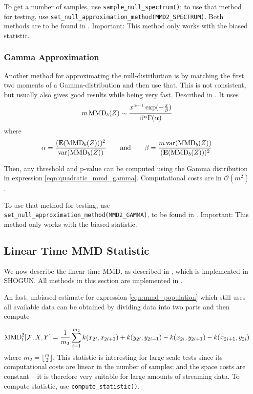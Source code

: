 To get a number of samples, use \texttt{sample\_null\_spectrum()}; to use that method for testing, use \texttt{set\_null\_approximation\_method(MMD2\_SPECTRUM)}. Both methods are to be found in . Important: This method only works with the biased statistic.
\subsubsection{Gamma Approximation}
Another method for approximating the null-distribution is by matching the first two moments of a Gamma-distribution and then use that. This is not consistent, but usually also gives good results while being very fast. Described in \citep{Gretton2012b}. It uses
\begin{align}
\label{eqn:quadratic_mmd_gamma}
m\operatorname{MMD}_b(Z) \sim \frac{x^{\alpha-1}\exp(-\frac{x}{\beta})}{\beta^\alpha \Gamma(\alpha)}
\end{align}
where
\begin{align*}
\alpha=\frac{(\textbf{E}(\text{MMD}_b(Z)))^2}{\operatorname{var}(\text{MMD}_b(Z))} \qquad \text{and} \qquad
 \beta=\frac{m \operatorname{var}(\text{MMD}_b(Z))}{(\textbf{E}(\text{MMD}_b(Z)))^2}
\end{align*}

Then, any threshold and p-value can be computed using the Gamma distribution in expression \ref{eqn:quadratic_mmd_gamma}. Computational costs are in $\mathcal{O}(m^2)$.

To use that method for testing, use \texttt{set\_null\_approximation\_method(MMD2\_GAMMA)}, to be found in . Important: This method only works with the biased statistic.


\subsection{Linear Time MMD Statistic}
\label{sec:mmd_linear}
We now describe the linear time MMD, as described in \citep[Section 6]{Gretton2012}, which is implemented in SHOGUN. All methods in this section are implemented in .

An fast, unbiased estimate for expression \ref{eqn:mmd_population} which still uses all available data can be obtained by dividing data into two parts and then compute

\begin{align*}
\operatorname{MMD}_l^2[\mathcal{F},X,Y]=\frac{1}{m_2}\sum_{i=1}^{m_2} k(x_{2i},x_{2i+1})+k(y_{2i},y_{2i+1})-k(x_{2i},y_{2i+1})-
  k(x_{2i+1},y_{2i})
\end{align*}
where $ m_2=\lfloor\frac{m}{2} \rfloor$. This statistic is interesting for large scale tests since its computational costs are linear in the number of samples; and the space costs are constant -- it is therefore very suitable for large amounts of streaming data. To compute statistic, use \texttt{compute\_statistic()}.

